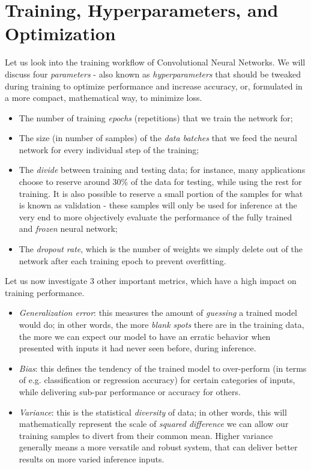 \section{Training, Hyperparameters, and Optimization}
Let us look into the training workflow of Convolutional Neural Networks. We will discuss four \textit{parameters} - also known as \textit{hyperparameters} that should be tweaked during training to optimize performance and increase accuracy, or, formulated in a more compact, mathematical way, to minimize loss.
\begin{itemize}
    \item The number of training \textit{epochs} (repetitions) that we train the network for;
    \item The size (in number of samples) of the \textit{data batches} that we feed the neural network for every individual step of the training;
    \item The \textit{divide} between training and testing data; for instance, many applications choose to reserve around 30\% of the data for testing, while using the rest for training. It is also possible to reserve a small portion of the samples for what is known as validation - these samples will only be used for inference at the very end to more objectively evaluate the performance of the fully trained and \textit{frozen} neural network;
    \item The \textit{dropout rate}, which is the number of weights we simply delete out of the network after each training epoch to prevent overfitting.
\end{itemize}
Let us now investigate 3 other important metrics, which have a high impact on training performance.
\begin{itemize}
    \item \textit{Generalization error}: this measures the amount of \textit{guessing} a trained model would do; in other words, the more \textit{blank spots} there are in the training data, the more we can expect our model to have an erratic behavior when presented with inputs it had never seen before, during inference.
    \item \textit{Bias}: this defines the tendency of the trained model to over-perform (in terms of e.g. classification or regression accuracy) for certain categories of inputs, while delivering sub-par performance or accuracy for others.
    \item \textit{Variance}: this is the statistical \textit{diversity} of data; in other words, this will mathematically represent the scale of \textit{squared difference} we can allow our training samples to divert from their common mean. Higher variance generally means a more versatile and robust system, that can deliver better results on more varied inference inputs.
\end{itemize}

